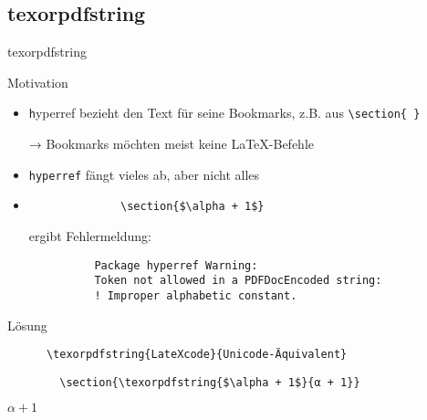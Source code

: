 \subsection{texorpdfstring}

\begin{frame}[fragile]{texorpdfstring}

  \begin{block}{Motivation}
    \begin{itemize}
      \item {\texttt hyperref} bezieht den Text für seine Bookmarks, z.B. aus \lstinline+\section{ }+ 
      \item[→]  Bookmarks möchten meist keine \LaTeX-Befehle
      \item \texttt{hyperref} fängt vieles ab, aber nicht alles
      \item \begin{lstlisting}
              \section{$\alpha + 1$}
            \end{lstlisting}
      ergibt Fehlermeldung:
        \begin{lstlisting}
          Package hyperref Warning:
          Token not allowed in a PDFDocEncoded string:
          ! Improper alphabetic constant.
        \end{lstlisting}
    \end{itemize}
  \end{block}
  \begin{block}{Lösung}
    \begin{lstlisting}
      \texorpdfstring{LateXcode}{Unicode-Äquivalent}
    \end{lstlisting}
   \end{block}
    \begin{CodeExample}{0.49}
      \begin{lstlisting}
        \section{\texorpdfstring{$\alpha + 1$}{α + 1}}
      \end{lstlisting}
      \CodeResult
      $\alpha + 1$
    \end{CodeExample}
\end{frame}
